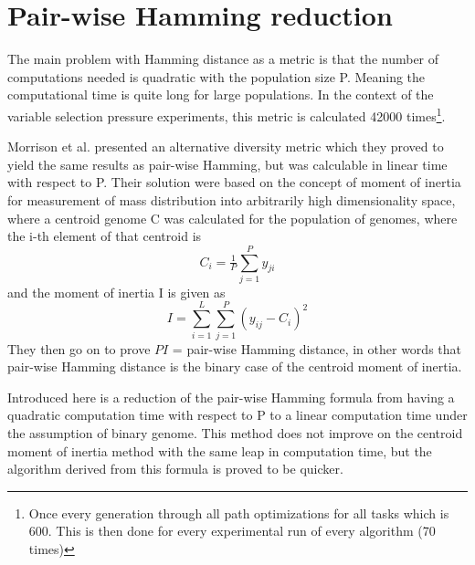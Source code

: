 \chapter{Pair-wise Hamming reduction}
\label{appendix:Hammingreduction}
The main problem with Hamming distance as a metric is that the number of computations needed is quadratic with the population size P. Meaning the computational time is quite long for large populations. In the context of the variable selection pressure experiments, this metric is calculated 42000 times\footnote{Once every generation through all path optimizations for all tasks which is 600. This is then done for every experimental run of every algorithm (70 times)}.

Morrison et al. presented\cite{populationDiversity} an alternative diversity metric which they proved to yield the same results as pair-wise Hamming, but was calculable in linear time with respect to P. Their solution were based on the concept of moment of inertia for measurement of mass distribution into arbitrarily high dimensionality space, where a centroid genome C was calculated for the population of genomes, where the i-th element of that centroid is
\begin{equation}
    \label{eq:centroid}
    C_{i}=\tfrac{1}{P}\sum_{j=1}^{P}y_{ji}
\end{equation}
and the moment of inertia I is given as 
\begin{equation}
    \label{eq:Inertiadiversity}
    I  = \sum_{i=1}^{L}\sum_{j=1}^{P}\left ( y_{ij}-C_{i} \right )^{2}
\end{equation}
They then go on to prove \(PI\) = pair-wise Hamming distance, in other words that pair-wise Hamming distance is the binary case of the centroid moment of inertia.

Introduced here is a reduction of the pair-wise Hamming formula from having a quadratic computation time with respect to P to a linear computation time under the assumption of binary genome. This method does not improve on the centroid moment of inertia method with the same leap in computation time, but the algorithm derived from this formula is proved to be quicker. 

